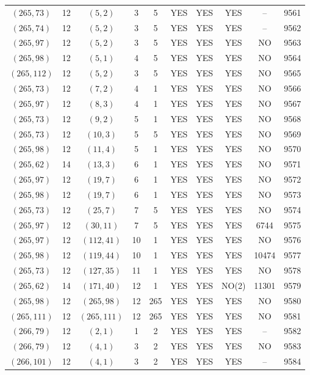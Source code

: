\begin{longtable}{|c|c|c|c|c|c|c|c|c|c|}
$(265, 73)$ & 12 & $(5, 2)$ & 3 & 5 & YES & YES & YES & -- & 9561\\
$(265, 74)$ & 12 & $(5, 2)$ & 3 & 5 & YES & YES & YES & -- & 9562\\
$(265, 97)$ & 12 & $(5, 2)$ & 3 & 5 & YES & YES & YES & NO & 9563\\
$(265, 98)$ & 12 & $(5, 1)$ & 4 & 5 & YES & YES & YES & NO & 9564\\
$(265, 112)$ & 12 & $(5, 2)$ & 3 & 5 & YES & YES & YES & NO & 9565\\
$(265, 73)$ & 12 & $(7, 2)$ & 4 & 1 & YES & YES & YES & NO & 9566\\
$(265, 97)$ & 12 & $(8, 3)$ & 4 & 1 & YES & YES & YES & NO & 9567\\
$(265, 73)$ & 12 & $(9, 2)$ & 5 & 1 & YES & YES & YES & NO & 9568\\
$(265, 73)$ & 12 & $(10, 3)$ & 5 & 5 & YES & YES & YES & NO & 9569\\
$(265, 98)$ & 12 & $(11, 4)$ & 5 & 1 & YES & YES & YES & NO & 9570\\
$(265, 62)$ & 14 & $(13, 3)$ & 6 & 1 & YES & YES & YES & NO & 9571\\
$(265, 97)$ & 12 & $(19, 7)$ & 6 & 1 & YES & YES & YES & NO & 9572\\
$(265, 98)$ & 12 & $(19, 7)$ & 6 & 1 & YES & YES & YES & NO & 9573\\
$(265, 73)$ & 12 & $(25, 7)$ & 7 & 5 & YES & YES & YES & NO & 9574\\
$(265, 97)$ & 12 & $(30, 11)$ & 7 & 5 & YES & YES & YES & 6744 & 9575\\
$(265, 97)$ & 12 & $(112, 41)$ & 10 & 1 & YES & YES & YES & NO & 9576\\
$(265, 98)$ & 12 & $(119, 44)$ & 10 & 1 & YES & YES & YES & 10474 & 9577\\
$(265, 73)$ & 12 & $(127, 35)$ & 11 & 1 & YES & YES & YES & NO & 9578\\
$(265, 62)$ & 14 & $(171, 40)$ & 12 & 1 & YES & YES & NO(2) & 11301 & 9579\\
$(265, 98)$ & 12 & $(265, 98)$ & 12 & 265 & YES & YES & YES & NO & 9580\\
$(265, 111)$ & 12 & $(265, 111)$ & 12 & 265 & YES & YES & YES & NO & 9581\\
$(266, 79)$ & 12 & $(2, 1)$ & 1 & 2 & YES & YES & YES & -- & 9582\\
$(266, 79)$ & 12 & $(4, 1)$ & 3 & 2 & YES & YES & YES & NO & 9583\\
$(266, 101)$ & 12 & $(4, 1)$ & 3 & 2 & YES & YES & YES & -- & 9584\\

\end{longtable}
